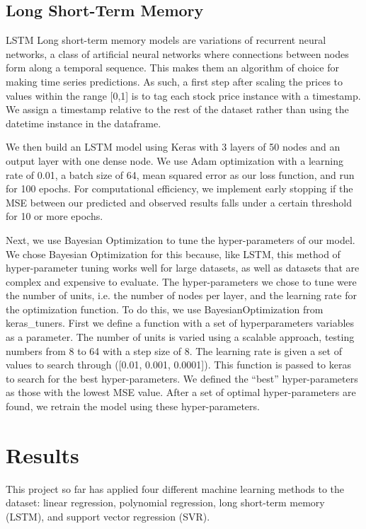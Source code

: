 \documentclass[12pt,a4paper]{article}
\begin{document}
\subsection{Long Short-Term Memory}
LSTM
Long short-term memory models are variations of recurrent neural networks, a class of artificial neural networks where connections between nodes form along a temporal sequence. This makes them an algorithm of choice for making time series predictions. As such, a first step after scaling the prices to values within the range [0,1] is to tag each stock price instance with a timestamp. We assign a timestamp relative to the rest of the dataset rather than using the datetime instance in the dataframe.

We then build an LSTM model using Keras with 3 layers of 50 nodes and an output layer with one dense node. We use Adam optimization with a learning rate of 0.01, a batch size of 64, mean squared error as our loss function, and run for 100 epochs. For computational efficiency, we implement early stopping if the MSE between our predicted and observed results falls under a certain threshold for 10 or more epochs.

Next, we use Bayesian Optimization to tune the hyper-parameters of our model. We chose Bayesian Optimization for this because, like LSTM, this method of hyper-parameter tuning works well for large datasets, as well as datasets that are complex and expensive to evaluate. The hyper-parameters we chose to tune were the number of units, i.e. the number of nodes per layer, and the learning rate for the optimization function. To do this, we use BayesianOptimization from keras\_tuners. First we define a function with a set of hyperparameters variables as a parameter. The number of units is varied using a scalable approach, testing numbers from 8 to 64 with a step size of 8. The learning rate is given a set of values to search through ([0.01, 0.001, 0.0001]). This function is passed to keras to search for the best hyper-parameters. We defined the “best” hyper-parameters as those with the lowest MSE value. After a set of optimal hyper-parameters are found, we retrain the model using these hyper-parameters. 

\section{Results}
This project so far has applied four different machine learning methods to the dataset: linear regression, polynomial regression, long short-term memory (LSTM), and support vector regression (SVR).
\end{document}
